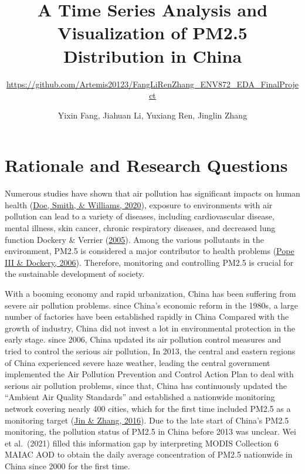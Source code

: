 \documentclass[
  12pt,
]{article}
\title{A Time Series Analysis and Visualization of PM2.5 Distribution in
China}
\subtitle{\url{https://github.com/Artemis20123/FangLiRenZhang_ENV872_EDA_FinalProject}}
\author{Yixin Fang, Jiahuan Li, Yuxiang Ren, Jinglin Zhang}
\date{}
\begin{document}
\maketitle

\newpage
\tableofcontents 
\newpage
\listoftables 
\newpage
\listoffigures 
\newpage

\hypertarget{rationale-and-research-questions}{%
\section{Rationale and Research
Questions}\label{rationale-and-research-questions}}

Numerous studies have shown that air pollution has significant impacts
on human health (\protect\hyperlink{ref-intro1}{Doe, Smith, \& Williams,
2020}), exposure to environments with air pollution can lead to a
variety of diseases, including cardiovascular disease, mental illness,
skin cancer, chronic respiratory diseases, and decreased lung function
Dockery \& Verrier (\protect\hyperlink{ref-intro3}{2005}). Among the
various pollutants in the environment, PM2.5 is considered a major
contributor to health problems (\protect\hyperlink{ref-intro4}{Pope III
\& Dockery, 2006}). Therefore, monitoring and controlling PM2.5 is
crucial for the sustainable development of society.

With a booming economy and rapid urbanization, China has been suffering
from severe air pollution problems. since China's economic reform in the
1980s, a large number of factories have been established rapidly in
China Compared with the growth of industry, China did not invest a lot
in environmental protection in the early stage. since 2006, China
updated its air pollution control measures and tried to control the
serious air pollution, In 2013, the central and eastern regions of China
experienced severe haze weather, leading the central government
implemented the Air Pollution Prevention and Control Action Plan to deal
with serious air pollution problems, since that, China has continuously
updated the ``Ambient Air Quality Standards'' and established a
nationwide monitoring network covering nearly 400 cities, which for the
first time included PM2.5 as a monitoring target
(\protect\hyperlink{ref-intro5}{Jin \& Zhang, 2016}). Due to the late
start of China's PM2.5 monitoring, the pollution status of PM2.5 in
China before 2013 was unclear. Wei et al.~(2021) filled this information
gap by interpreting MODIS Collection 6 MAIAC AOD to obtain the daily
average concentration of PM2.5 nationwide in China since 2000 for the
first time.
\end{document}
